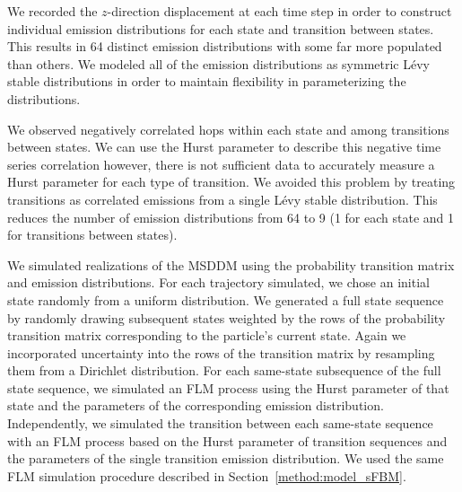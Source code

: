 \documentclass{article}
\begin{document}
  We recorded the $z$-direction displacement at each time step in order to construct 
  individual emission distributions for each state and transition between states. 
  This results in 64 distinct emission distributions with some far more populated than
  others. We modeled all of the emission distributions as symmetric L\'evy stable 
  distributions in order to maintain flexibility in parameterizing the distributions.
  
  We observed negatively correlated hops within each state and among transitions between
  states. We can use the Hurst parameter to describe this negative time series correlation
  however, there is not sufficient data to accurately measure a Hurst parameter for 
  each type of transition. We avoided this problem by treating transitions as correlated
  emissions from a single L\'evy stable distribution. This reduces the number of emission
  distributions from 64 to 9 (1 for each state and 1 for transitions between states).
  
  We simulated realizations of the MSDDM using the probability transition matrix and 
  emission distributions. For each trajectory simulated, we chose an initial state
  randomly from a uniform distribution. We generated a full state sequence by randomly
  drawing subsequent states weighted by the rows of the probability transition matrix
  corresponding to the particle's current state. 
  Again we incorporated uncertainty into
  the rows of the transition matrix by resampling them from a Dirichlet distribution. 
  For each same-state subsequence of the full state sequence, we simulated an FLM process
  using the Hurst parameter of that state and the parameters of the corresponding emission
  distribution. Independently, we simulated the transition between each same-state 
  sequence with an FLM process based on the Hurst parameter of transition sequences and 
  the parameters of the single transition emission distribution. We used the same FLM 
  simulation procedure described in Section~\ref{method:model_sFBM}.

\end{document}
